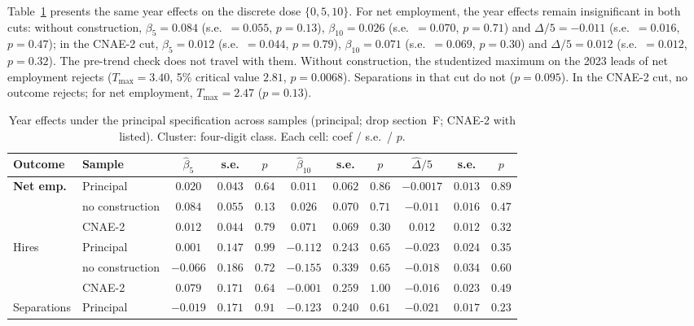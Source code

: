 \documentclass[12pt,a4paper]{article}
\begin{document}
Table~\ref{tab:att_rob} presents the same year effects on the discrete dose $\{0,5,10\}$. For net employment, the year effects remain insignificant in both cuts: without construction, $\beta_5=0.084$ (s.e.\ $=0.055$, $p=0.13$), $\beta_{10}=0.026$ (s.e.\ $=0.070$, $p=0.71$) and $\Delta/5=-0.011$ (s.e.\ $=0.016$, $p=0.47$); in the CNAE-2 cut, $\beta_5=0.012$ (s.e.\ $=0.044$, $p=0.79$), $\beta_{10}=0.071$ (s.e.\ $=0.069$, $p=0.30$) and $\Delta/5=0.012$ (s.e.\ $=0.012$, $p=0.32$). The pre-trend check does not travel with them. Without construction, the studentized maximum on the 2023 leads of net employment rejects ($T_{\max}=3.40$, 5\% critical value $2.81$, $p=0.0068$). Separations in that cut do not ($p=0.095$). In the CNAE-2 cut, no outcome rejects; for net employment, $T_{\max}=2.47$ ($p=0.13$).

\begin{table}[H]
\centering
\caption{Year effects under the principal specification across samples (principal; drop section~F; CNAE-2 with listed).
Cluster: four-digit class. Each cell: coef / s.e.\ / $p$.}
\label{tab:att_rob}
{\scriptsize
\setlength{\tabcolsep}{2.2pt}
\begin{tabular}{llccccccccc}
\toprule
Outcome & Sample & $\hat\beta_5$ & s.e. & $p$ & $\hat\beta_{10}$ & s.e. & $p$ & $\widehat{\Delta}/5$ & s.e. & $p$ \\
\midrule
\multirow{3}{*}{\textbf{Net emp.}}
 & Principal & $\mathbf{0.020}$ & $\mathbf{0.043}$ & $\mathbf{0.64}$ & $\mathbf{0.011}$ & $\mathbf{0.062}$ & $\mathbf{0.86}$ & $\mathbf{-0.0017}$ & $\mathbf{0.013}$ & $\mathbf{0.89}$ \\
 & no construction & $0.084$ & $0.055$ & $0.13$ & $0.026$ & $0.070$ & $0.71$ & $-0.011$ & $0.016$ & $0.47$ \\
 & CNAE-2 & $0.012$ & $0.044$ & $0.79$ & $0.071$ & $0.069$ & $0.30$ & $0.012$ & $0.012$ & $0.32$ \\
\midrule
\multirow{3}{*}{Hires}
 & Principal & $0.001$ & $0.147$ & $0.99$ & $-0.112$ & $0.243$ & $0.65$ & $-0.023$ & $0.024$ & $0.35$ \\
 & no construction & $-0.066$ & $0.186$ & $0.72$ & $-0.155$ & $0.339$ & $0.65$ & $-0.018$ & $0.034$ & $0.60$ \\
 & CNAE-2 & $0.079$ & $0.171$ & $0.64$ & $-0.001$ & $0.259$ & $1.00$ & $-0.016$ & $0.023$ & $0.49$ \\
\midrule
\multirow{3}{*}{Separations}
 & Principal & $-0.019$ & $0.171$ & $0.91$ & $-0.123$ & $0.240$ & $0.61$ & $-0.021$ & $0.017$ & $0.23$ \\

\end{tabular}}
\end{table}
\end{document}
